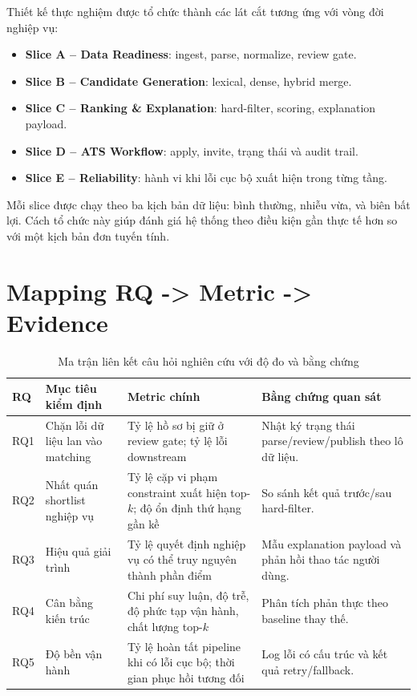 Thiết kế thực nghiệm được tổ chức thành các lát cắt tương ứng với vòng đời nghiệp vụ:

\begin{itemize}
  \item \textbf{Slice A -- Data Readiness}: ingest, parse, normalize, review gate.
  \item \textbf{Slice B -- Candidate Generation}: lexical, dense, hybrid merge.
  \item \textbf{Slice C -- Ranking \& Explanation}: hard-filter, scoring, explanation payload.
  \item \textbf{Slice D -- ATS Workflow}: apply, invite, trạng thái và audit trail.
  \item \textbf{Slice E -- Reliability}: hành vi khi lỗi cục bộ xuất hiện trong từng tầng.
\end{itemize}

Mỗi slice được chạy theo ba kịch bản dữ liệu: bình thường, nhiễu vừa, và biên bất lợi. Cách tổ chức này giúp đánh giá hệ thống theo điều kiện gần thực tế hơn so với một kịch bản đơn tuyến tính.

\section{Mapping RQ -> Metric -> Evidence}

\begin{table}[H]
\caption{Ma trận liên kết câu hỏi nghiên cứu với độ đo và bằng chứng}
\centering
\begin{tabularx}{\textwidth}{p{}p{}p{}X}
\toprule
\textbf{RQ} & \textbf{Mục tiêu kiểm định} & \textbf{Metric chính} & \textbf{Bằng chứng quan sát}\
\\
\midrule
RQ1 & Chặn lỗi dữ liệu lan vào matching & Tỷ lệ hồ sơ bị giữ ở review gate; tỷ lệ lỗi downstream & Nhật ký trạng thái parse/review/publish theo lô dữ liệu.\\
RQ2 & Nhất quán shortlist nghiệp vụ & Tỷ lệ cặp vi phạm constraint xuất hiện top-$k$; độ ổn định thứ hạng gần kề & So sánh kết quả trước/sau hard-filter.\\
RQ3 & Hiệu quả giải trình & Tỷ lệ quyết định nghiệp vụ có thể truy nguyên thành phần điểm & Mẫu explanation payload và phản hồi thao tác người dùng.\\
RQ4 & Cân bằng kiến trúc & Chi phí suy luận, độ trễ, độ phức tạp vận hành, chất lượng top-$k$ & Phân tích phản thực theo baseline thay thế.\\
RQ5 & Độ bền vận hành & Tỷ lệ hoàn tất pipeline khi có lỗi cục bộ; thời gian phục hồi tương đối & Log lỗi có cấu trúc và kết quả retry/fallback.\\
\bottomrule
\end{tabularx}
\end{table}

